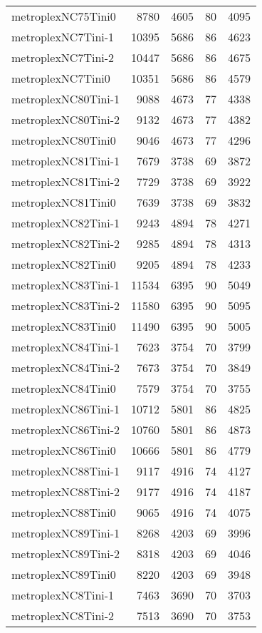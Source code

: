 \documentclass[../../../thesis.tex]{subfiles}
\begin{document}
\begin{longtable}{lrrrr}
metroplexNC75Tini0 & 8780 & 4605 & 80 & 4095 \\
metroplexNC7Tini-1 & 10395 & 5686 & 86 & 4623 \\
metroplexNC7Tini-2 & 10447 & 5686 & 86 & 4675 \\
metroplexNC7Tini0 & 10351 & 5686 & 86 & 4579 \\
metroplexNC80Tini-1 & 9088 & 4673 & 77 & 4338 \\
metroplexNC80Tini-2 & 9132 & 4673 & 77 & 4382 \\
metroplexNC80Tini0 & 9046 & 4673 & 77 & 4296 \\
metroplexNC81Tini-1 & 7679 & 3738 & 69 & 3872 \\
metroplexNC81Tini-2 & 7729 & 3738 & 69 & 3922 \\
metroplexNC81Tini0 & 7639 & 3738 & 69 & 3832 \\
metroplexNC82Tini-1 & 9243 & 4894 & 78 & 4271 \\
metroplexNC82Tini-2 & 9285 & 4894 & 78 & 4313 \\
metroplexNC82Tini0 & 9205 & 4894 & 78 & 4233 \\
metroplexNC83Tini-1 & 11534 & 6395 & 90 & 5049 \\
metroplexNC83Tini-2 & 11580 & 6395 & 90 & 5095 \\
metroplexNC83Tini0 & 11490 & 6395 & 90 & 5005 \\
metroplexNC84Tini-1 & 7623 & 3754 & 70 & 3799 \\
metroplexNC84Tini-2 & 7673 & 3754 & 70 & 3849 \\
metroplexNC84Tini0 & 7579 & 3754 & 70 & 3755 \\
metroplexNC86Tini-1 & 10712 & 5801 & 86 & 4825 \\
metroplexNC86Tini-2 & 10760 & 5801 & 86 & 4873 \\
metroplexNC86Tini0 & 10666 & 5801 & 86 & 4779 \\
metroplexNC88Tini-1 & 9117 & 4916 & 74 & 4127 \\
metroplexNC88Tini-2 & 9177 & 4916 & 74 & 4187 \\
metroplexNC88Tini0 & 9065 & 4916 & 74 & 4075 \\
metroplexNC89Tini-1 & 8268 & 4203 & 69 & 3996 \\
metroplexNC89Tini-2 & 8318 & 4203 & 69 & 4046 \\
metroplexNC89Tini0 & 8220 & 4203 & 69 & 3948 \\
metroplexNC8Tini-1 & 7463 & 3690 & 70 & 3703 \\
metroplexNC8Tini-2 & 7513 & 3690 & 70 & 3753 \\

\end{longtable}
\end{document}

